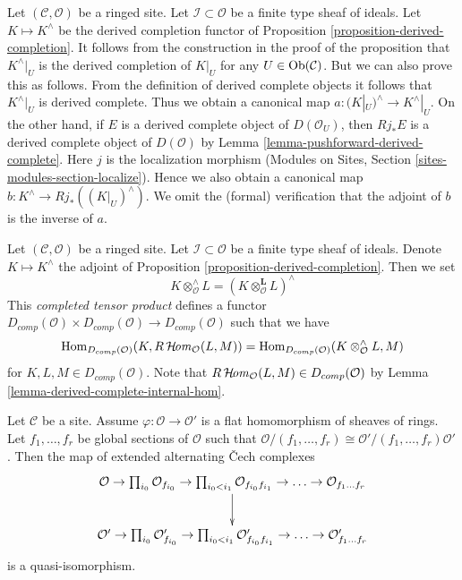 \begin{remark}
\label{remark-localization-and-completion}
Let $(\mathcal{C}, \mathcal{O})$ be a ringed site.
Let $\mathcal{I} \subset \mathcal{O}$ be a finite type sheaf of
ideals. Let $K \mapsto K^\wedge$ be the derived completion functor
of Proposition \ref{proposition-derived-completion}. It follows
from the construction in the proof of the proposition that $K^\wedge|_U$
is the derived completion of $K|_U$ for any $U \in \mathop{\mathrm{Ob}}\nolimits(\mathcal{C})$.
But we can also prove this as follows. From the definition
of derived complete objects it follows that $K^\wedge|_U$ is derived complete.
Thus we obtain a canonical map $a : (K|_U)^\wedge \to K^\wedge|_U$.
On the other hand, if $E$ is a derived complete object of
$D(\mathcal{O}_U)$, then $Rj_*E$ is a derived complete object of
$D(\mathcal{O})$ by Lemma \ref{lemma-pushforward-derived-complete}.
Here $j$ is the localization morphism
(Modules on Sites, Section \ref{sites-modules-section-localize}).
Hence we also obtain a canonical
map $b : K^\wedge \to Rj_*((K|_U)^\wedge)$. We omit the (formal) verification
that the adjoint of $b$ is the inverse of $a$.
\end{remark}

\begin{remark}
\label{remark-completed-tensor-product}
Let $(\mathcal{C}, \mathcal{O})$ be a ringed site. Let
$\mathcal{I} \subset \mathcal{O}$ be a finite type sheaf of ideals. 
Denote $K \mapsto K^\wedge$ the adjoint of
Proposition \ref{proposition-derived-completion}.
Then we set
$$
K \otimes^\wedge_\mathcal{O} L = (K \otimes_\mathcal{O}^\mathbf{L} L)^\wedge
$$
This {\it completed tensor product} defines a functor
$D_{comp}(\mathcal{O}) \times D_{comp}(\mathcal{O}) \to D_{comp}(\mathcal{O})$
such that we have
$$
\mathop{\mathrm{Hom}}\nolimits_{D_{comp}(\mathcal{O})}(K, R\mathop{\mathcal{H}\!\mathit{om}}\nolimits_\mathcal{O}(L, M))
=
\mathop{\mathrm{Hom}}\nolimits_{D_{comp}(\mathcal{O})}(K \otimes_\mathcal{O}^\wedge L, M)
$$
for $K, L, M \in D_{comp}(\mathcal{O})$. Note that
$R\mathop{\mathcal{H}\!\mathit{om}}\nolimits_\mathcal{O}(L, M) \in D_{comp}(\mathcal{O})$ by
Lemma \ref{lemma-derived-complete-internal-hom}.
\end{remark}

\begin{lemma}
\label{lemma-map-identifies-koszul-and-cech-complexes}
Let $\mathcal{C}$ be a site.
Assume $\varphi : \mathcal{O} \to \mathcal{O}'$ is a flat homomorphism
of sheaves of rings. Let $f_1, \ldots, f_r$ be global sections
of $\mathcal{O}$ such that $\mathcal{O}/(f_1, \ldots, f_r) \cong
\mathcal{O}'/(f_1, \ldots, f_r)\mathcal{O}'$.
Then the map of extended alternating {\v C}ech complexes
$$
\xymatrix{
\mathcal{O} \to
\prod_{i_0} \mathcal{O}_{f_{i_0}} \to
\prod_{i_0 < i_1} \mathcal{O}_{f_{i_0}f_{i_1}} \to \ldots \to
\mathcal{O}_{f_1\ldots f_r} \ar[d] \\
\mathcal{O}' \to
\prod_{i_0} \mathcal{O}'_{f_{i_0}} \to
\prod_{i_0 < i_1} \mathcal{O}'_{f_{i_0}f_{i_1}} \to \ldots \to
\mathcal{O}'_{f_1\ldots f_r}
}
$$
is a quasi-isomorphism.
\end{lemma}

